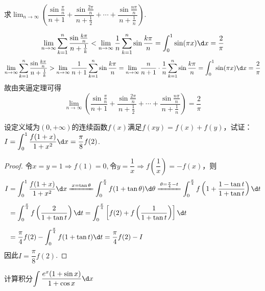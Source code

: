 \documentclass[12pt, a4paper, oneside, UTF8]{ctexbook}
\begin{document}
\begin{exercise}
    求$\displaystyle\lim_{n \to \infty} \left( \dfrac{\sin \frac{\pi}{n}}{n+1} + \dfrac{\sin \frac{2\pi}{n}}{n+\frac{1}{2}} + \cdots + \dfrac{\sin \frac{n\pi}{n}}{n+\frac{1}{n}} \right)$.
\end{exercise}
\begin{solution}
    \[
        \lim_{n \to \infty} \sum_{k=1}^{n} \dfrac{\sin \frac{k\pi}{n}}{n + \frac{1}{k}}
        < \lim_{n \to \infty} \frac{1}{n}\sum_{k=1}^{n} \sin \frac{k\pi}{n}
        = \int_{0}^{1} \sin (\pi x) \d x = \dfrac{2}{\pi}
    \]
    \[
        \lim_{n \to \infty} \sum_{k=1}^{n} \dfrac{\sin \frac{k\pi}{n}}{n + \frac{1}{k}}
        > \lim_{n \to \infty} \dfrac{1}{n+1} \sum_{k=1}^{n} \sin \frac{k\pi}{n}
        = \lim_{n \to \infty} \dfrac{n}{n+1} \cdot \dfrac{1}{n} \sum_{k=1}^{n} \sin \frac{k\pi}{n}
        = \int_{0}^{1} \sin (\pi x) \d x = \dfrac{2}{\pi}
    \]  
    故由夹逼定理可得
    \[
        \lim_{n \to \infty} \left( \dfrac{\sin \frac{\pi}{n}}{n+1} + \dfrac{\sin \frac{2\pi}{n}}{n+\frac{1}{2}} + \cdots + \dfrac{\sin \frac{n\pi}{n}}{n+\frac{1}{n}} \right) = \boxed{\dfrac{2}{\pi}}
    \]
\end{solution}
\begin{exercise}
    设定义域为$(0, +\infty)$的连续函数$f(x)$满足$f(xy)=f(x)+f(y)$，试证：$I=\displaystyle\int_{0}^{1} \dfrac{f(1+x)}{1+x^2} \d x = \dfrac{\pi}{8} f(2)$.
\end{exercise}
\begin{proof}
    令$x = y = 1 \Rightarrow f(1) = 0,$令$y = \dfrac{1}{x} \Rightarrow f\left(\dfrac{1}{x}\right) = -f(x)$，则
    \begin{align*}
        I &= \int_{0}^{1} \dfrac{f(1+x)}{1+x^2} \d x
        \xlongequal{x = \tan \theta} \int_{0}^{\frac{\pi}{4}} f(1+\tan \theta) \d \theta
        \xlongequal{ \theta = \frac{\pi}{4} - t} \int_{0}^{\frac{\pi}{4}} f\left(1+\dfrac{1-\tan t}{1+\tan t}\right) \d t\\[6pt]
        &= \int_{0}^{\frac{\pi}{4}} f\left(\dfrac{2}{1+\tan t}\right) \d t
        = \int_{0}^{\frac{\pi}{4}} \left[ f(2) + f\left(\dfrac{1}{1+\tan t}\right) \right] \d t\\[6pt]
        &= \dfrac{\pi}{4} f(2) - \int_{0}^{\frac{\pi}{4}} f(1+\tan t) \d t
        = \dfrac{\pi}{4} f(2) - I
    \end{align*}
    因此$I = \dfrac{\pi}{8} f(2)$.
\end{proof}
\begin{exercise}
    计算积分$\displaystyle\int \frac{e^x (1+\sin x)}{1 + \cos x} \d x$
\end{exercise}
\end{document}
